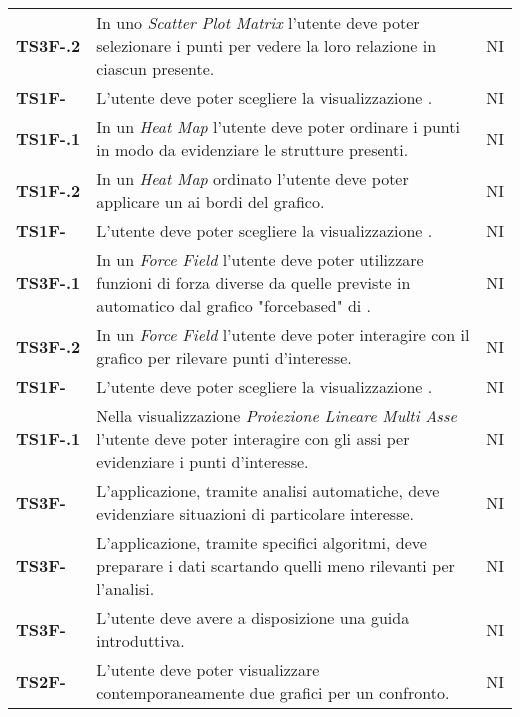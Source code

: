 {\begin{longtable}{ C{2cm} | C{12cm}| C{1.5cm} }
\textbf{TS3F-.2} & 
In uno \textit{Scatter Plot Matrix} l'utente deve poter selezionare i punti per vedere la loro relazione in ciascun  presente. & 
NI\\

\textbf{TS1F-} & 
L'utente deve poter scegliere la visualizzazione . & 
NI\\

\textbf{TS1F-.1} & 
In un \textit{Heat Map} l'utente deve poter ordinare i punti in modo da evidenziare le strutture presenti. & 
NI\\

\textbf{TS1F-.2} & 
In un \textit{Heat Map} ordinato l'utente deve poter applicare un  ai bordi del grafico. & 
NI\\

\textbf{TS1F-} & 
L'utente deve poter scegliere la visualizzazione . & 
NI\\

\textbf{TS3F-.1} & 
In un \textit{Force Field} l'utente deve poter utilizzare funzioni di forza diverse da quelle previste in automatico dal grafico "forcebased" di . & 
NI\\

\textbf{TS3F-.2} & 
In un \textit{Force Field} l'utente deve poter interagire con il grafico per rilevare punti d'interesse. & 
NI\\

\textbf{TS1F-} & 
L'utente deve poter scegliere la visualizzazione . & 
NI\\

\textbf{TS1F-.1} & 
Nella visualizzazione \textit{Proiezione Lineare Multi Asse} l'utente deve poter interagire con gli assi per evidenziare i punti d'interesse. & 
NI\\

\textbf{TS3F-} & 
L'applicazione, tramite analisi automatiche, deve evidenziare situazioni di particolare interesse. & 
NI\\

\textbf{TS3F-} & 
L'applicazione, tramite specifici algoritmi, deve preparare i dati scartando quelli meno rilevanti per l'analisi. & 
NI\\

\textbf{TS3F-} & 
L'utente deve avere a disposizione una guida introduttiva. & 
NI\\

\textbf{TS2F-} & 
L'utente deve poter visualizzare contemporaneamente due grafici per un confronto. & 
NI\\


\end{longtable}}
